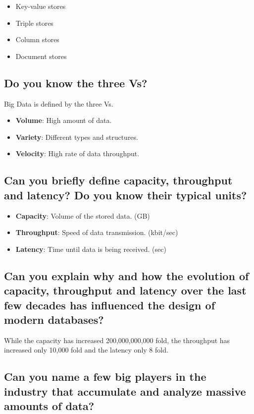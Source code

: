 \documentclass{article}
\begin{document}
\begin{itemize}
    \item Key-value stores
    \item Triple stores
    \item Column stores
    \item Document stores
\end{itemize}

\subsection{Do you know the three Vs?}


Big Data is defined by the three Vs.
\begin{itemize}
    \item \textbf{Volume}: High amount of data.
    \item \textbf{Variety}: Different types and structures.
    \item \textbf{Velocity}: High rate of data throughput.
\end{itemize}



\subsection{Can you briefly define capacity, throughput and latency? Do you know their typical units?}

\begin{itemize}
    \item \textbf{Capacity}: Volume of the stored data. (GB)
    \item \textbf{Throughput}: Speed of data transmission. (kbit/sec)
    \item \textbf{Latency}: Time until data is being received. (sec)
\end{itemize}

\subsection{Can you explain why and how the evolution of capacity, throughput and latency over the last few decades has influenced the design of modern databases?}

While the capacity has increased 200,000,000,000 fold, the throughput has increased only 10,000 fold and the latency only 8 fold.

\subsection{Can you name a few big players in the industry that accumulate and analyze massive amounts of data?}
\end{document}
